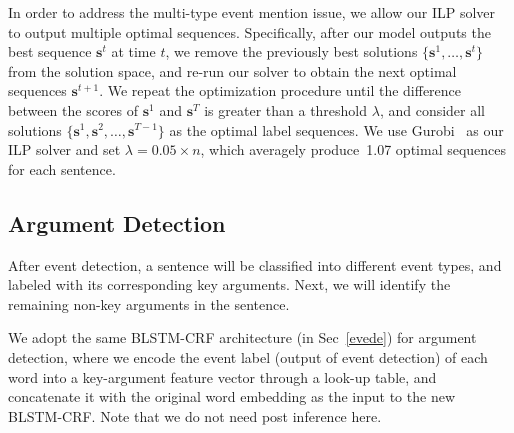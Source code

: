 In order to address the multi-type event mention issue, we allow our ILP solver to output multiple optimal sequences.
Specifically, after our model outputs the best sequence $\bm{s}^t$ at time $t$, we remove the previously best solutions
 $\{\bm{s}^1, \ldots, \bm{s}^{t}\}$ from the solution space, and re-run our solver to obtain the next optimal sequences $\bm{s}^{t+1}$.
We repeat the optimization procedure until the difference between the scores of $\bm{s}^1$ and $\bm{s}^T$ is greater
than a threshold $\lambda$, and consider all solutions $\{\bm{s}^1, \bm{s}^2, \ldots, \bm{s}^{T-1}\}$ as the optimal label sequences.
We use Gurobi~\cite{gurobi} as our ILP solver and set $\lambda=0.05 \times n$, which averagely produce~1.07 optimal sequences for each sentence.

\subsection{Argument Detection}
After event detection, a sentence will be classified into different event types, and labeled with its corresponding key arguments.
Next, we will identify the remaining non-key arguments in the sentence.

We adopt the same BLSTM-CRF architecture (in Sec~\ref{evede}) for argument detection, where we encode the event label (output of event detection) of each word into a key-argument feature vector through a look-up table, and concatenate it with the original word embedding as the input to the new BLSTM-CRF. Note that we do not need post inference here.
